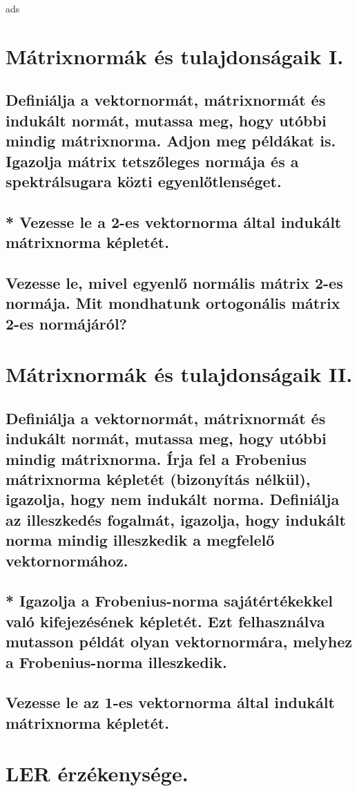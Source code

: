 \documentclass{article}
\begin{document}
ads
    \section{Mátrixnormák és tulajdonságaik I.}
        \subsection{Definiálja a vektornormát, mátrixnormát és indukált normát, mutassa meg, hogy utóbbi mindig mátrixnorma. Adjon meg példákat is. Igazolja mátrix tetszőleges normája és a spektrálsugara közti egyenlőtlenséget.}
        \subsection{* Vezesse le a 2-es vektornorma által indukált mátrixnorma képletét.}
        \subsection{Vezesse le, mivel egyenlő normális mátrix 2-es normája. Mit mondhatunk ortogonális mátrix 2-es normájáról?}


    \section{Mátrixnormák és tulajdonságaik II.}
        \subsection{Definiálja a vektornormát, mátrixnormát és indukált normát, mutassa meg, hogy utóbbi mindig mátrixnorma. Írja fel a Frobenius mátrixnorma képletét (bizonyítás nélkül), igazolja, hogy nem indukált norma. Definiálja az illeszkedés fogalmát, igazolja, hogy indukált norma mindig illeszkedik a megfelelő vektornormához.}
        \subsection{* Igazolja a Frobenius-norma sajátértékekkel való kifejezésének képletét. Ezt felhasználva mutasson példát olyan vektornormára, melyhez a Frobenius-norma illeszkedik.}
        \subsection{Vezesse le az 1-es vektornorma által indukált mátrixnorma képletét.}

    
    \section{LER érzékenysége.}
\end{document}
